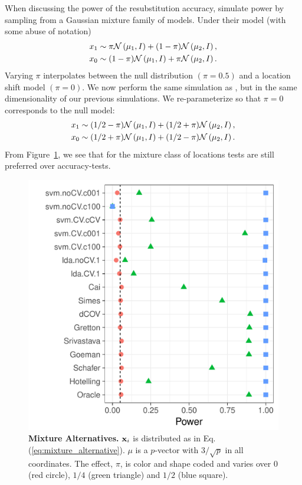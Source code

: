 \documentclass[]{bio}
\begin{document}
When discussing the power of the resubstitution accuracy, \cite{golland_permutation_2005} simulate power by sampling from a Gaussian mixture family of models. 
Under their model (with some abuse of notation)
\begin{align*}
\begin{split}
x_1 & \sim \pi \mathcal{N}\left(\mu_1,I\right)+ (1-\pi) \mathcal{N}\left(\mu_2,I\right), \\
x_0 & \sim (1-\pi) \mathcal{N}\left(\mu_1,I\right)+ \pi \mathcal{N}\left(\mu_2,I\right).
\end{split}
\end{align*}
Varying $\pi$ interpolates between the null distribution $(\pi=0.5)$ and a location shift model $(\pi=0)$. 
We now perform the same simulation as \cite{golland_permutation_2005}, but in the same dimensionality of our previous simulations.
We re-parameterize so that $\pi=0$ corresponds to the null model:
\begin{align}
\begin{split}
\label{eq:mixture_alternative}
x_1 & \sim (1/2-\pi) \mathcal{N}\left(\mu_1,I\right)+ (1/2+\pi) \mathcal{N}\left(\mu_2,I\right), \\
x_0 & \sim (1/2+\pi) \mathcal{N}\left(\mu_1,I\right)+ (1/2-\pi) \mathcal{N}\left(\mu_2,I\right).	
\end{split}
\end{align}
From Figure~\ref{fig:file12}, we see that for the mixture class of \cite{golland_permutation_2005} locations tests are still preferred over accuracy-tests. 


\begin{figure}[h]
	\centering
	\includegraphics[width=0.5\columnwidth]{"art/file12"}
	\caption{\textbf{Mixture Alternatives.} $\mathbf{x}_i$ is distributed as in Eq.(\ref{eq:mixture_alternative}). 
		$\mu$ is a $p$-vector with $3/\sqrt{p}$ in all coordinates.
		The effect, $\pi$, is color and shape coded and varies over $0$ (red circle), $1/4$ (green triangle) and $1/2$ (blue square). }
	\label{fig:file12}
\end{figure}
\end{document}
